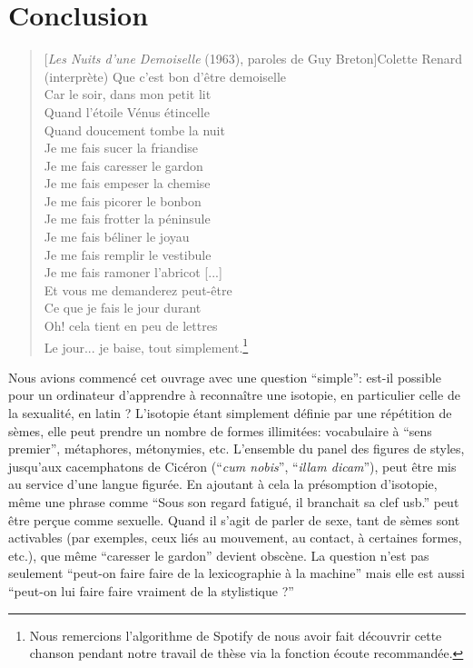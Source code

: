 \chapter*{Conclusion}

\begin{quote}[\textit{Les Nuits d'une Demoiselle} (1963), paroles de Guy Breton]{Colette Renard (interprète)}
Que c'est bon d'être demoiselle \\
Car le soir, dans mon petit lit \\
Quand l'étoile Vénus étincelle \\
Quand doucement tombe la nuit \\  
Je me fais sucer la friandise \\
Je me fais caresser le gardon \\
Je me fais empeser la chemise \\
Je me fais picorer le bonbon \\
Je me fais frotter la péninsule \\
Je me fais béliner le joyau \\
Je me fais remplir le vestibule \\
Je me fais ramoner l'abricot {[...]} \\
Et vous me demanderez peut-être \\
Ce que je fais le jour durant \\
Oh! cela tient en peu de lettres \\
Le jour... je baise, tout simplement.\footnote{Nous remercions l'algorithme de Spotify de nous avoir fait découvrir cette chanson pendant notre travail de thèse via la fonction écoute recommandée.}
\end{quote}

Nous avions commencé cet ouvrage avec une question \enquote{simple}: est-il possible pour un ordinateur d'apprendre à reconnaître une isotopie, en particulier celle de la sexualité, en latin ? L'isotopie étant simplement définie par une répétition de sèmes, elle peut prendre un nombre de formes illimitées: vocabulaire à \enquote{sens premier}, métaphores, métonymies, etc. L'ensemble du panel des figures de styles, jusqu'aux cacemphatons de Cicéron (\enquote{\textit{cum nobis}}, \enquote{\textit{illam dicam}}), peut être mis au service d'une langue figurée. En ajoutant à cela la présomption d'isotopie, même une phrase comme \enquote{Sous son regard fatigué, il branchait sa clef usb.} peut être perçue comme sexuelle. Quand il s'agit de parler de sexe, tant de sèmes sont activables (par exemples, ceux liés au mouvement, au contact, à certaines formes, etc.), que même \enquote{caresser le gardon} devient obscène. La question n'est pas seulement \enquote{peut-on faire faire de la lexicographie à la machine} mais elle est aussi \enquote{peut-on lui faire faire vraiment de la stylistique ?}

